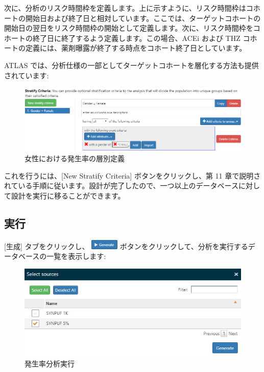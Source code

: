 \documentclass[
  11pt]{book}
\theoremstyle{definition}
\theoremstyle{definition}
\theoremstyle{definition}
\theoremstyle{definition}
\theoremstyle{remark}
\begin{document}
次に、分析のリスク時間枠を定義します。上に示すように、リスク時間枠はコホートの開始日および終了日と相対しています。ここでは、ターゲットコホートの開始日の翌日をリスク時間枠の開始として定義します。次に、リスク時間枠をコホートの終了日に終了するよう定義します。この場合、ACEi および THZ コホートの定義には、薬剤曝露が終了する時点をコホート終了日としています。

ATLAS では、分析仕様の一部としてターゲットコホートを層化する方法も提供されています:

\begin{figure}

{\centering \includegraphics[width=1\linewidth]{images/Characterization/atlasIncidenceStratifyFemale} 

}

\caption{女性における発生率の層別定義}\label{fig:atlasIncidenceStratifyFemale}
\end{figure}

これを行うには、{[}New Stratify Criteria{]} ボタンをクリックし、第 11 章で説明されている手順に従います。設計が完了したので、一つ以上のデータベースに対して設計を実行に移ることができます。

\subsection{実行}\label{ux5b9fux884c-2}

{[}生成{]} タブをクリックし、 \includegraphics{images/Characterization/atlasIncidenceGenerate.png} ボタンをクリックして、分析を実行するデータベースの一覧を表示します:

\begin{figure}

{\centering \includegraphics[width=1\linewidth]{images/Characterization/atlasIncidenceSourceSelection} 

}

\caption{発生率分析実行}\label{fig:atlasIncidenceSourceSelection}
\end{figure}
\end{document}
